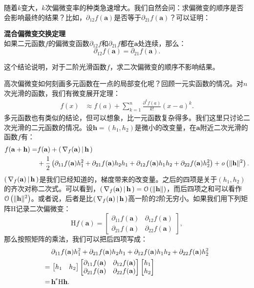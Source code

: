 \documentclass[12pt,UTF8]{ctexbook}
\begin{document}
随着$k$变大，$k$次偏微变率的种类急速增大。我们自然会问：求偏微变的顺序是否会影响最终的结果？比如，$\partial_{12} f(\mathbf{a})$是否等于$\partial_{21} f(\mathbf{a})$？可以证明：
\begin{tm}{\textbf{混合偏微变交换定理}}\\
    如果二元函数$f$的偏微变函数$\partial_{12} f$和$\partial_{21} f$都在$\mathbf{a}$处连续，那么：
    $$ \partial_{12} f(\mathbf{a}) = \partial_{21} f(\mathbf{a}).$$
\end{tm}
这个结论说明，对于二阶光滑函数$f$，求二次偏微变的顺序不影响结果。


高次偏微变如何刻画多元函数在一点的局部变化呢？回顾一元实函数的情况。对$n$次光滑的函数，我们有微变展开定理：
\begin{align*}
    f(x) &\approx f(a) + \sum_{k=1}^n \frac{\partial^k f (a)}{k!}(x - a)^k .
\end{align*}
多元函数也有类似的结论，但可以想象，比一元函数复杂得多。我们这里只讨论二次光滑的二元函数的情况。设$\mathbf{h} = (h_1,h_2)$是微小的改变量，在$\mathbf{a}$附近二次光滑的函数$f$有：
\begin{align*}
    f(\mathbf{a} + \mathbf{h}) = & f(\mathbf{a}) + \displaystyle\left( \,\nabla_f(\mathbf{a}) \,\middle\vert \,\mathbf{h} \,\right) \\
    &+ \frac{1}{2} \left(\partial_{11} f(\mathbf{a})h_1^2 + \partial_{21} f(\mathbf{a})h_2h_1 + \partial_{12} f(\mathbf{a})h_1h_2 + \partial_{22} f(\mathbf{a})h_2^2\right) + \mathit{o}\left(\|\mathbf{h}\|^2\right).
\end{align*}
$\displaystyle\left( \,\nabla_f(\mathbf{a}) \,\middle\vert \,\mathbf{h} \,\right)$是我们已经知道的，梯度带来的改变量。之后的四项是关于$(h_1,h_2)$的齐次对称二次式。可以看到，$\displaystyle\left( \,\nabla_f(\mathbf{a}) \,\middle\vert \,\mathbf{h} \,\right) = \mathcal{O}\left(\|\mathbf{h}\|\right)$，而后四项之和可以看作$\mathcal{O}\left(\|\mathbf{h}\|^2\right)$。或者说，后者是比$\displaystyle\left( \,\nabla_f(\mathbf{a}) \,\middle\vert \,\mathbf{h} \,\right)$高一阶的$2$阶无穷小。如果我们用下列矩阵$\mathrm{H}$记录二次偏微变：
$$
 \mathrm{H}f(\mathbf{a}) = \begin{bmatrix} \partial_{11} f(\mathbf{a}) & \partial_{12} f(\mathbf{a}) \\ \partial_{21} f(\mathbf{a}) & \partial_{22} f(\mathbf{a}) \end{bmatrix} , 
$$
那么按照矩阵的乘法，我们可以把后四项写成：
\begin{align*}
    &\partial_{11} f(\mathbf{a})h_1^2 + \partial_{21} f(\mathbf{a})h_2h_1 + \partial_{12} f(\mathbf{a})h_1h_2 + \partial_{22} f(\mathbf{a})h_2^2 \\
    =\,& \begin{bmatrix}
h_1 & h_2
\end{bmatrix}\begin{bmatrix} \partial_{11} f(\mathbf{a}) & \partial_{12} f(\mathbf{a}) \\ \partial_{21} f(\mathbf{a}) & \partial_{22} f(\mathbf{a}) \end{bmatrix} \begin{bmatrix}
h_1\\h_2
\end{bmatrix}\\
=\,&\mathbf{h}^{\tr} \mathrm{H} \mathbf{h}.
\end{align*}
\end{document}
